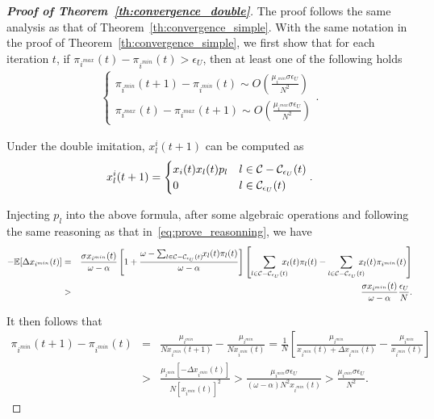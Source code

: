 \documentclass[12pt, onecolumn]{IEEEtran}
\theoremstyle{plain}
\theoremstyle{definition}
\begin{document}
\begin{proof}[\textbf{Proof of Theorem~\ref{th:convergence_double}}]

The proof follows the same analysis as that of Theorem~\ref{th:convergence_simple}. With the same notation in the proof of Theorem~\ref{th:convergence_simple}, we first show that for each iteration $t$, if $\pi_{i^{max}}(t)-\pi_{i^{min}}(t)>\epsilon_U$, then at least one of the following holds
\begin{eqnarray*}
\begin{cases}
\pi_{i^{min}}(t+1)-\pi_{i^{min}}(t) \sim O(\frac{\mu_{i^{min}}\sigma\epsilon_U}{N^2}) \\
\pi_{i^{max}}(t)-\pi_{i^{max}}(t+1) \sim O(\frac{\mu_{i^{max}}\sigma\epsilon_U}{N^2})
\end{cases}.
\end{eqnarray*}

Under the double imitation, $x^i_l(t+1)$ can be computed as
\begin{equation*}
x^i_l(t+1)=
\begin{cases}
x_i(t)x_l(t)p_{l} & l\in{\cal C}-{\cal C}_{\epsilon_U}(t) \\
0 & l\in{\cal C}_{\epsilon_U}(t)
\end{cases}.
\end{equation*}

Injecting $p_l$ into the above formula, after some algebraic operations and following the same reasoning as that in~\eqref{eq:prove_reasonning}, we have
\begin{eqnarray*}
-\mathbb{E}[\Delta x_{i^{min}}(t)] &=& \frac{\sigma x_{i^{min}}(t)}{\omega-\alpha}\left[1+\frac{\omega-\sum_{l\in{\cal C}-{\cal C}_{\epsilon_U}(t)} \hspace{-0.1cm}x_l(t)\pi_l(t)}{\omega-\alpha}\right]
\left[\sum_{l\in{\cal C}-{\cal C}_{\epsilon_U}(t)} \hspace{-0.3cm}x_l(t)\pi_l(t)-\sum_{l\in{\cal C}-{\cal C}_{\epsilon_U}(t)} \hspace{-0.3cm}x_l(t)\pi_{i^{min}}(t)\right] \\
&>& \frac{\sigma x_{i^{min}}(t)}{\omega-\alpha}\frac{\epsilon_U}{N}.
\end{eqnarray*}

It then follows that
\begin{eqnarray*}
\pi_{i^{min}}(t+1)-\pi_{i^{min}}(t) &=& \frac{\mu_{i^{min}}}{Nx_{i^{min}}(t+1)}-\frac{\mu_{i^{min}}}{Nx_{i^{min}}(t)} = \frac{1}{N}\left[\frac{\mu_{i^{min}}}{x_{i^{min}}(t)+\Delta x_{i^{min}}(t)}-\frac{\mu_{i^{min}}}{x_{i^{min}}(t)}\right] \\
                                    & > & \frac{\mu_{i^{min}}[-\Delta x_{i^{min}}(t)]}{N[x_{i^{min}}(t)]^2} >\frac{\mu_{i^{min}}\sigma\epsilon_U}{(\omega-\alpha)N^2x_{i^{min}}(t)}>\frac{\mu_{i^{min}}\sigma\epsilon_U}{N^2}.
\end{eqnarray*}


\end{proof}
\end{document}
